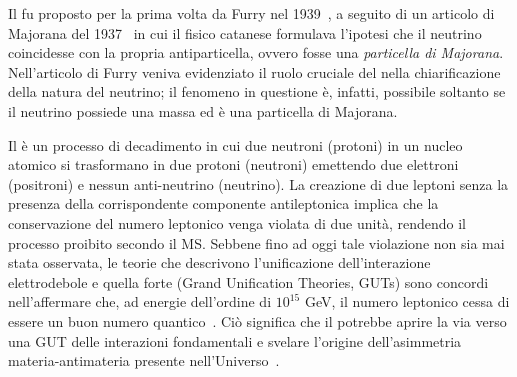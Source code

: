 Il \doppiobeta{} fu proposto per la prima volta da Furry nel 1939~\cite{furry:pr39}, a seguito di un articolo di Majorana del 1937~\cite{majorana:nc37} in cui il fisico catanese formulava l'ipotesi che il neutrino coincidesse con la propria antiparticella, ovvero fosse una \emph{particella di Majorana}. 
Nell'articolo di Furry veniva evidenziato il ruolo cruciale del \doppiobeta{} nella chiarificazione della natura del neutrino; il fenomeno in questione è, infatti, possibile soltanto se il neutrino possiede una massa ed è una particella di Majorana. 



Il \doppiobeta{} è un processo di decadimento in cui due neutroni (protoni) in un nucleo atomico si trasformano in due protoni (neutroni) emettendo due elettroni (positroni) e nessun anti-neutrino (neutrino).
La creazione di due leptoni senza la presenza della corrispondente componente antileptonica implica che la conservazione del numero leptonico venga violata di due unità, rendendo il processo proibito secondo il MS. 
Sebbene fino ad oggi tale violazione non sia mai stata osservata, le teorie che descrivono l'unificazione dell'interazione elettrodebole e quella forte (Grand Unification Theories, GUTs) sono concordi nell'affermare che, ad energie dell'ordine di $10^{15}$ GeV, il numero leptonico cessa di essere un buon numero quantico~\cite{pirro:epja06}. 
Ciò significa che il \doppiobeta{} potrebbe aprire la via verso una GUT delle interazioni fondamentali e svelare l'origine dell'asimmetria materia-antimateria presente nell'Universo~\cite{vergados:ijmpe16}.

